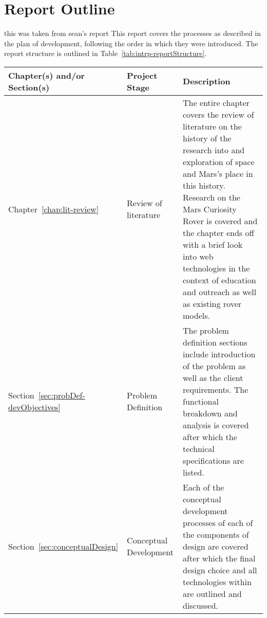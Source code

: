 \section{Report Outline}
this was taken from sean's report 
This report covers the processes as described in the plan of development, following the order in which they were introduced. The report structure is outlined in Table~\ref{tab:intrp-reportStructure}.
  
  \begin{longtable}{@{}L{0.15\textwidth}L{0.2\textwidth}L{0.6\textwidth}@{}}
  \toprule
  \textbf{Chapter(s) and/or Section(s)}                                                       & \textbf{Project Stage}                             & \textbf{Description}                                                                                                                                                                                                                                                                                                                                                                                            \\ \midrule
  Chapter~\ref{chap:lit-review}                                                    & Review of literature                      & The entire chapter covers the review of literature on the history of the research into and exploration of space and Mars's place in this history. Research on the Mars Curiosity Rover is covered and the chapter ends off with a brief look into web technologies in the context of education and outreach as well as existing rover models.                                                          \\ \midrule
  Section~\ref{sec:probDef-devObjectives}                                          & Problem Definition                        & The problem definition sections include introduction of the problem as well as the client requirements. The functional breakdown and analysis is covered after which the technical specifications are listed.                                                                                                                                                                                          \\ \midrule
  Section~\ref{sec:conceptualDesign}                                               & Conceptual Development                    & Each of the conceptual development processes of each of the components of design are covered after which the final design choice and all technologies within are outlined and discussed.                                                                                                                                                                                                               \\ \midrule

\end{longtable}
